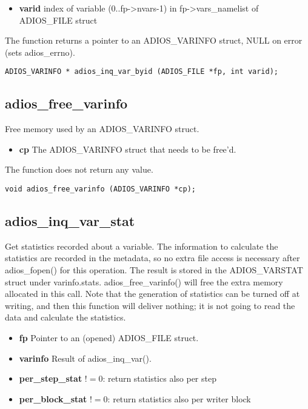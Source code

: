 \begin{itemize}
\item{\bf varid}    index of variable (0..fp->nvars-1)
in fp->vars\_namelist of ADIOS\_FILE struct
\end{itemize}

\noindent The function returns a pointer to an  ADIOS\_VARINFO struct, NULL on error (sets adios\_errno).

\begin{lstlisting}[alsolanguage=C]
ADIOS_VARINFO * adios_inq_var_byid (ADIOS_FILE *fp, int varid);
\end{lstlisting}

\subsection{adios\_free\_varinfo}
Free memory used by an ADIOS\_VARINFO struct. 
\begin{itemize}
\item{\bf cp} The ADIOS\_VARINFO struct that needs to be free'd. 
\end{itemize}

\noindent The function does not return any value.

\begin{lstlisting}[alsolanguage=C]
void adios_free_varinfo (ADIOS_VARINFO *cp);
\end{lstlisting}

\subsection{adios\_inq\_var\_stat}
Get statistics recorded about a variable. The information to calculate the statistics are recorded in the metadata,
so no extra file access is necessary after adios\_fopen() for this operation.
The result is stored in the ADIOS\_VARSTAT struct under varinfo.stats. 
adios\_free\_varinfo() will free the extra memory allocated in this call. 
Note that the generation of statistics can be turned off at writing, and then this function will deliver 
nothing; it is not going to read the data and calculate the statistics. 

\begin{itemize}
\item{\bf fp}  Pointer to an (opened) ADIOS\_FILE struct.
\item{\bf  varinfo}        Result of adios\_inq\_var(). 
\item{\bf per\_step\_stat}  $!=0$: return statistics also per step
\item{\bf per\_block\_stat} $!=0$: return statistics also per writer block 
\end{itemize}

